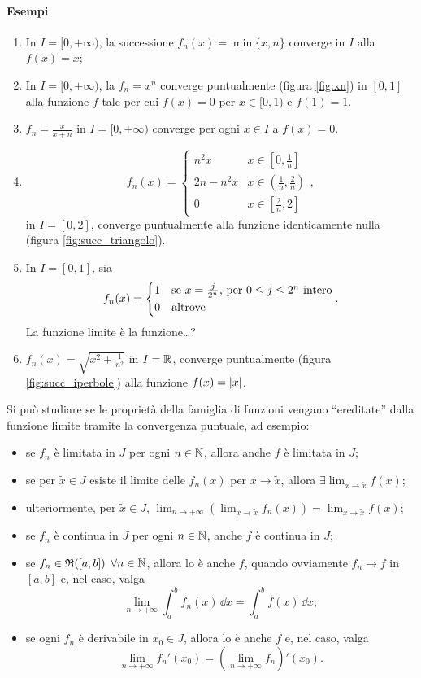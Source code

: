 \paragraph{Esempi}
\begin{enumerate}
\item In $I=[0,+\infty)$, la successione $f_n(x)=\min\{x,n\}$ converge in $I$ alla $f(x)=x$;
\item In $I=[0,+\infty)$, la $f_n=x^n$ converge puntualmente (figura \ref{fig:xn}) in $[0,1]$ alla funzione $f$ tale per cui $f(x)=0$ per $x\in[0,1)$ e $f(1)=1$.

\item $f_n=\frac{x}{x+n}$ in $I=[0,+\infty)$ converge per ogni $x\in I$ a $f(x)=0$.
\item\[
f_n(x)=\begin{cases}n^2x&x\in[0,\frac1{n}]\\ 2n-n^2x&x\in(\frac1{n},\frac2{n})\\ 0&x\in[\frac2{n},2]\end{cases},
\]
in $I=[0,2]$, converge puntualmente alla funzione identicamente nulla (figura \ref{fig:succ_triangolo}).

\item In $I=[0,1]$, sia
\[
f_n(x)=\begin{cases*}1&se $x=\frac{j}{2^n}$, per $0\leq j\leq 2^n$ intero\\ 0&altrove\end{cases*}.
\]
La funzione limite è la funzione\dots?
\item $f_n(x)=\sqrt{x^2+\frac1{n^2}}$ in $I=\mathbb{R}$, converge puntualmente (figura \ref{fig:succ_iperbole}) alla funzione $f(x)=\lvert x\rvert$.

\end{enumerate}
Si può studiare se le proprietà della famiglia di funzioni vengano ``ereditate'' dalla funzione limite tramite la convergenza puntuale, ad esempio:
\begin{itemize}
\item se $f_n$ è limitata in $J$ per ogni $n\in\mathbb{N}$, allora anche $f$ è limitata in $J$;
\item se per $\tilde{x}\in J$ esiste il limite delle $f_n(x)$ per $x\to\tilde{x}$, allora $\exists\lim_{x\to\tilde{x}}f(x)$;
\item ulteriormente, per $\tilde{x}\in J$, $\lim_{n\to+\infty}\left(\lim_{x\to\tilde{x}}f_n(x)\right)=\lim_{x\to\tilde{x}}f(x)$;
\item se $f_n$ è continua in $J$ per ogni $n\in\mathbb{N}$, anche $f$ è continua in $J$;
\item se $f_n\in\mathfrak{R}([a,b])$ $\forall n\in\mathbb{N}$, allora lo è anche $f$, quando ovviamente $f_n\to f$ in $[a,b]$ e, nel caso, valga
\[
\lim_{n\to+\infty}\int_a^bf_n(x)\,\dd x=\int_a^bf(x)\,\dd x;
\]
\item se ogni $f_n$ è derivabile in $x_0\in J$, allora lo è anche $f$ e, nel caso, valga
\[
\lim_{n\to+\infty}f_n'(x_0)=\left(\lim_{n\to+\infty}f_n\right)'(x_0).
\]
\end{itemize}
